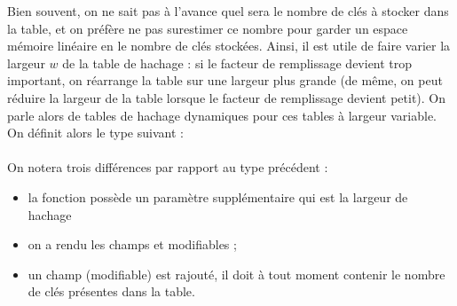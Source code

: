 \documentclass[10pt,a4paper, varwidth]{article}
\begin{document}
	Bien souvent, on ne sait pas à l'avance quel sera le nombre de clés à stocker dans la table, 
    et on préfère ne pas surestimer ce nombre pour garder un espace mémoire linéaire en le nombre de clés stockées. 
    Ainsi, il est utile de faire varier la largeur $w$ de la table de hachage : si le
	facteur de remplissage devient trop important, on réarrange la table sur une largeur plus grande (de même, on
	peut réduire la largeur de la table lorsque le facteur de remplissage devient petit). On parle alors de tables de
	hachage dynamiques pour ces tables à largeur variable.\\
	On définit alors le type suivant :\\
	\\
	On notera trois différences par rapport au type précédent :
	\begin{itemize}
		\item la fonction  possède un paramètre supplémentaire qui est la largeur de hachage
		\item on a rendu les champs  et  modifiables ;
		\item un champ  (modifiable) est rajouté, il doit à tout moment contenir le nombre de clés présentes dans la table.
	\end{itemize}
\end{document}
